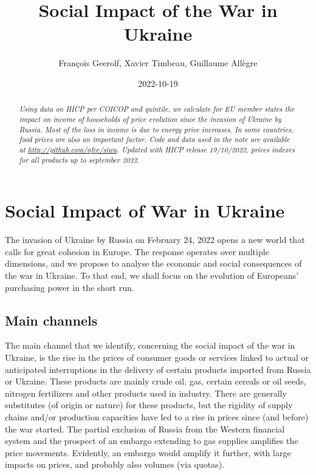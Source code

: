 \documentclass[
  9pt,
  a4paper,
  numbers=noendperiod,
  DIV=12]{scrartcl}
\title{Social Impact of the War in Ukraine}
\author{François Geerolf, Xavier Timbeau, Guillaume Allègre}
\date{2022-10-19}
\renewcommand*\contentsname{Table of contents}
\newcommand\contentsname{Table of contents}
\begin{document}
\maketitle
\begin{abstract}
\emph{Using data on HICP per COICOP and quintile, we calculate for EU
member states the impact on income of households of price evolution
since the invasion of Ukraine by Russia. Most of the loss in income is
due to energy price increases. In some countries, food prices are also
an important factor. Code and data used in the note are available at
\url{http://github.com/ofce/siwu}. Updated with HICP release 19/10/2022,
prices indexes for all products up to september 2022.}
\end{abstract}
\ifdefined\Shaded\renewenvironment{Shaded}{\begin{tcolorbox}[frame hidden, breakable, sharp corners, enhanced, boxrule=0pt, borderline west={3pt}{0pt}{shadecolor}, interior hidden]}{\end{tcolorbox}}\fi

\renewcommand*\contentsname{Table of contents}
{
\hypersetup{linkcolor=}
\setcounter{tocdepth}{1}
\tableofcontents
}
\hypertarget{social-impact-of-war-in-ukraine}{%
\section{Social Impact of War in
Ukraine}\label{social-impact-of-war-in-ukraine}}

The invasion of Ukraine by Russia on February 24, 2022 opens a new world
that calls for great cohesion in Europe. The response operates over
multiple dimensions, and we propose to analyse the economic and social
consequences of the war in Ukraine. To that end, we shall focus on the
evolution of Europeans' purchasing power in the short run.

\hypertarget{main-channels}{%
\subsection{Main channels}\label{main-channels}}

The main channel that we identify, concerning the social impact of the
war in Ukraine, is the rise in the prices of consumer goods or services
linked to actual or anticipated interruptions in the delivery of certain
products imported from Russia or Ukraine. These products are mainly
crude oil, gas, certain cereals or oil seeds, nitrogen fertilizers and
other products used in industry. There are generally substitutes (of
origin or nature) for these products, but the rigidity of supply chains
and/or production capacities have led to a rise in prices since (and
before) the war started. The partial exclusion of Russia from the
Western financial system and the prospect of an embargo extending to gas
supplies amplifies the price movements. Evidently, an embargo would
amplify it further, with large impacts on prices, and probably also
volumes (via quotas).
\end{document}
